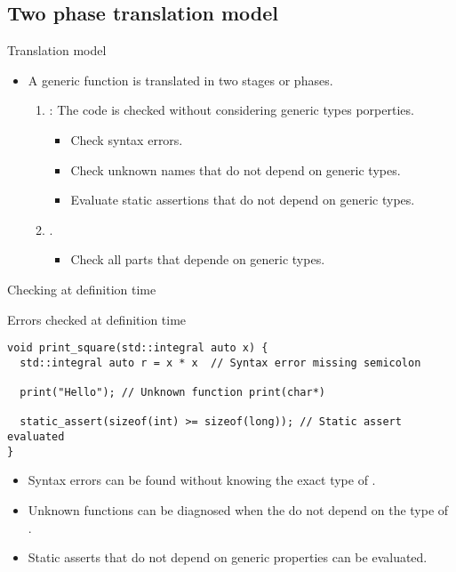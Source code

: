 \subsection{Two phase translation model}

\begin{frame}[t,fragile]{Translation model}
\begin{itemize}
  \item A generic function is translated in two stages or phases.

  \begin{enumerate}

    \item {}:
          The code is checked without considering generic types porperties.
      \begin{itemize}
        \item Check syntax errors.
        \item Check unknown names that do not depend on generic types.
        \item Evaluate static assertions that do not depend on generic types.
      \end{itemize}
    

    \item {}.
      \begin{itemize}
        \item Check all parts that depende on generic types.
      \end{itemize}

  \end{enumerate}
\end{itemize}
\end{frame}

\begin{frame}[t,fragile]{Checking at definition time}
\begin{block}{Errors checked at definition time}
\begin{lstlisting}
void print_square(std::integral auto x) {
  std::integral auto r = x * x  // Syntax error missing semicolon

  print("Hello"); // Unknown function print(char*)
               
  static_assert(sizeof(int) >= sizeof(long)); // Static assert evaluated
}
\end{lstlisting}
\end{block}

  \begin{itemize}
    \item Syntax errors can be found without knowing the exact type of .

    \item Unknown functions can be diagnosed when the do not depend on the type of .

    \item Static asserts that do not depend on generic properties can be evaluated.
  \end{itemize}
\end{frame}

